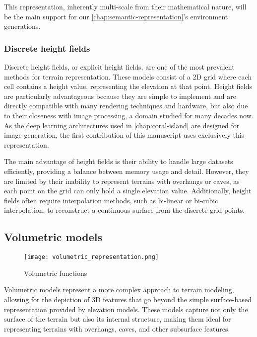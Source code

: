 This representation, inherently multi-scale from their mathematical nature, will be the main support for our \cref{chap:semantic-representation}'s environment generations.

\subsubsection{Discrete height fields}
Discrete height fields, or explicit height fields, are one of the most prevalent methods for terrain representation. These models consist of a 2D grid where each cell contains a height value, representing the elevation at that point. Height fields are particularly advantageous because they are simple to implement and are directly compatible with many rendering techniques and hardware, but also due to their closeness with image processing, a domain studied for many decades now. As the deep learning architectures used in \cref{chap:coral-island} are designed for image generation, the first contribution of this manuscript uses exclusively this representation.

The main advantage of height fields is their ability to handle large datasets efficiently, providing a balance between memory usage and detail. However, they are limited by their inability to represent terrains with overhangs or caves, as each point on the grid can only hold a single elevation value. Additionally, height fields often require interpolation methods, such as bi-linear or bi-cubic interpolation, to reconstruct a continuous surface from the discrete grid points. 

\subsection{Volumetric models}

\begin{figure}[H]
    \centering
    \texttt{[image: volumetric\_representation.png]}
    \caption{Volumetric functions}
    \label{fig:erosion-volume-representation}
\end{figure}

Volumetric models represent a more complex approach to terrain modeling, allowing for the depiction of 3D features that go beyond the simple surface-based representation provided by elevation models. These models capture not only the surface of the terrain but also its internal structure, making them ideal for representing terrains with overhangs, caves, and other subsurface features. 

